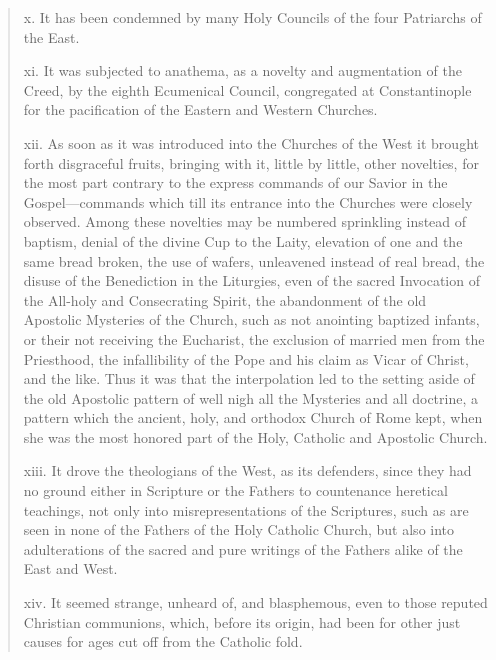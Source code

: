 \begin{quote}
x. It has been condemned by many Holy Councils of the four Patriarchs of
the East.

xi. It was subjected to anathema, as a novelty and augmentation of the
Creed, by the eighth Ecumenical Council, congregated at Constantinople
for the pacification of the Eastern and Western Churches.

xii. As soon as it was introduced into the Churches of the West it
brought forth disgraceful fruits, bringing with it, little by little,
other novelties, for the most part contrary to the express commands of
our Savior in the Gospel---commands which till its entrance into the
Churches were closely observed. Among these novelties may be numbered
sprinkling instead of baptism, denial of the divine Cup to the Laity,
elevation of one and the same bread broken, the use of wafers,
unleavened instead of real bread, the disuse of the Benediction in the
Liturgies, even of the sacred Invocation of the All-holy and
Consecrating Spirit, the abandonment of the old Apostolic Mysteries of
the Church, such as not anointing baptized infants, or their not
receiving the Eucharist, the exclusion of married men from the
Priesthood, the infallibility of the Pope and his claim as Vicar of
Christ, and the like. Thus it was that the interpolation led to the
setting aside of the old Apostolic pattern of well nigh all the
Mysteries and all doctrine, a pattern which the ancient, holy, and
orthodox Church of Rome kept, when she was the most honored part of the
Holy, Catholic and Apostolic Church.

xiii. It drove the theologians of the West, as its defenders, since they
had no ground either in Scripture or the Fathers to countenance
heretical teachings, not only into misrepresentations of the Scriptures,
such as are seen in none of the Fathers of the Holy Catholic Church, but
also into adulterations of the sacred and pure writings of the Fathers
alike of the East and West.

xiv. It seemed strange, unheard of, and blasphemous, even to those
reputed Christian communions, which, before its origin, had been for
other just causes for ages cut off from the Catholic fold.


\end{quote}
